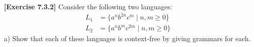\textbf{[Exercise 7.3.2]} Consider the following two languages:
\begin{align*}
    L_1 & = \{a^nb^{2n}c^m\mid n,m\ge 0\}\\
    L_2 & = \{a^nb^{m}c^{2m}\mid n,m\ge 0\}
\end{align*}
a) Show that each of these languages is context-free by giving grammars
for each.